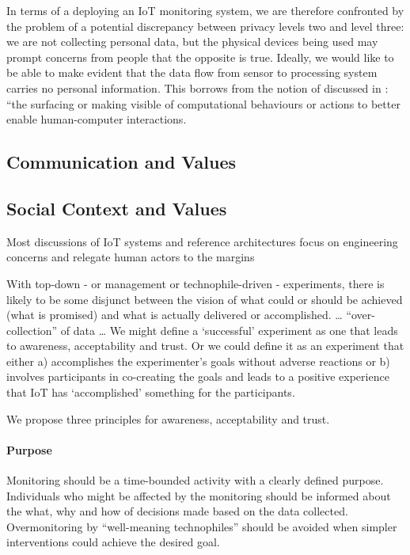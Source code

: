 In terms of a deploying an IoT monitoring system, we are therefore
confronted by the problem of a potential discrepancy between privacy
levels two and level three: we are not collecting personal data, but
the physical devices being used may prompt concerns from people that
the opposite is true. Ideally, we would like to be able to make
evident that the data flow from sensor to processing system carries no
personal information. This borrows from the notion of
 discussed in
\cite{Crabtree-2016-BAIT}: ``the surfacing or making visible of
computational behaviours or actions to better enable human-computer
interactions.

\subsection{Communication and Values}
\label{sec:communication-values}



\subsection{Social Context and Values}
\label{sec:social-context}

Most discussions of IoT systems and reference architectures \cite{Puschel-2016-WIAS} focus on
engineering concerns and relegate human
actors to the margins 



With top-down - or management or technophile-driven - experiments,
there is likely to be some disjunct between the vision of what could
or should be achieved (what is promised) and what is actually
delivered or accomplished. … “over-collection” of data 
…
We might define a ‘successful’ experiment as one that leads to
awareness, acceptability and trust. Or we could define it as an
experiment that either a) accomplishes the experimenter’s goals
without adverse reactions or b) involves participants in co-creating
the goals and leads to a positive experience that IoT has
‘accomplished’ something for the participants.  

We propose three principles for awareness, acceptability and trust.

\paragraph{Purpose} Monitoring should be a time-bounded activity with
a clearly defined purpose. Individuals who might be affected by the
monitoring should be informed about the what, why and how of decisions
made based on the data collected. Overmonitoring by “well-meaning
technophiles” should be avoided when simpler interventions could
achieve the desired goal. 

